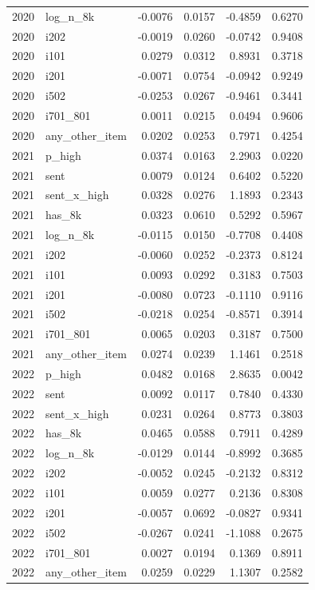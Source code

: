 \begin{tabular}{rlrrrr}
2020 & log\_n\_8k & -0.0076 & 0.0157 & -0.4859 & 0.6270 \\
2020 & i202 & -0.0019 & 0.0260 & -0.0742 & 0.9408 \\
2020 & i101 & 0.0279 & 0.0312 & 0.8931 & 0.3718 \\
2020 & i201 & -0.0071 & 0.0754 & -0.0942 & 0.9249 \\
2020 & i502 & -0.0253 & 0.0267 & -0.9461 & 0.3441 \\
2020 & i701\_801 & 0.0011 & 0.0215 & 0.0494 & 0.9606 \\
2020 & any\_other\_item & 0.0202 & 0.0253 & 0.7971 & 0.4254 \\
2021 & p\_high & 0.0374 & 0.0163 & 2.2903 & 0.0220 \\
2021 & sent & 0.0079 & 0.0124 & 0.6402 & 0.5220 \\
2021 & sent\_x\_high & 0.0328 & 0.0276 & 1.1893 & 0.2343 \\
2021 & has\_8k & 0.0323 & 0.0610 & 0.5292 & 0.5967 \\
2021 & log\_n\_8k & -0.0115 & 0.0150 & -0.7708 & 0.4408 \\
2021 & i202 & -0.0060 & 0.0252 & -0.2373 & 0.8124 \\
2021 & i101 & 0.0093 & 0.0292 & 0.3183 & 0.7503 \\
2021 & i201 & -0.0080 & 0.0723 & -0.1110 & 0.9116 \\
2021 & i502 & -0.0218 & 0.0254 & -0.8571 & 0.3914 \\
2021 & i701\_801 & 0.0065 & 0.0203 & 0.3187 & 0.7500 \\
2021 & any\_other\_item & 0.0274 & 0.0239 & 1.1461 & 0.2518 \\
2022 & p\_high & 0.0482 & 0.0168 & 2.8635 & 0.0042 \\
2022 & sent & 0.0092 & 0.0117 & 0.7840 & 0.4330 \\
2022 & sent\_x\_high & 0.0231 & 0.0264 & 0.8773 & 0.3803 \\
2022 & has\_8k & 0.0465 & 0.0588 & 0.7911 & 0.4289 \\
2022 & log\_n\_8k & -0.0129 & 0.0144 & -0.8992 & 0.3685 \\
2022 & i202 & -0.0052 & 0.0245 & -0.2132 & 0.8312 \\
2022 & i101 & 0.0059 & 0.0277 & 0.2136 & 0.8308 \\
2022 & i201 & -0.0057 & 0.0692 & -0.0827 & 0.9341 \\
2022 & i502 & -0.0267 & 0.0241 & -1.1088 & 0.2675 \\
2022 & i701\_801 & 0.0027 & 0.0194 & 0.1369 & 0.8911 \\
2022 & any\_other\_item & 0.0259 & 0.0229 & 1.1307 & 0.2582 \\
\bottomrule
\end{tabular}
